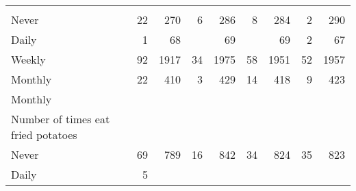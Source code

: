 \documentclass{article}
\begin{document}
\begin{tabular}{lllllllll}
  \multicolumn{1}{r}{} &
  \multicolumn{1}{r}{} &
  \multicolumn{1}{r}{} &
  \multicolumn{1}{r}{} \\
\multicolumn{1}{l}{\hspace{5em}Never} &
  \multicolumn{1}{|r}{22} &
  \multicolumn{1}{r}{270} &
  \multicolumn{1}{r}{6} &
  \multicolumn{1}{r}{286} &
  \multicolumn{1}{r}{8} &
  \multicolumn{1}{r}{284} &
  \multicolumn{1}{r}{2} &
  \multicolumn{1}{r}{290} \\
\multicolumn{1}{l}{\hspace{5em}Daily} &
  \multicolumn{1}{|r}{1} &
  \multicolumn{1}{r}{68} &
  \multicolumn{1}{r}{} &
  \multicolumn{1}{r}{69} &
  \multicolumn{1}{r}{} &
  \multicolumn{1}{r}{69} &
  \multicolumn{1}{r}{2} &
  \multicolumn{1}{r}{67} \\
\multicolumn{1}{l}{\hspace{5em}Weekly} &
  \multicolumn{1}{|r}{92} &
  \multicolumn{1}{r}{1917} &
  \multicolumn{1}{r}{34} &
  \multicolumn{1}{r}{1975} &
  \multicolumn{1}{r}{58} &
  \multicolumn{1}{r}{1951} &
  \multicolumn{1}{r}{52} &
  \multicolumn{1}{r}{1957} \\
\multicolumn{1}{l}{\hspace{5em}Monthly} &
  \multicolumn{1}{|r}{22} &
  \multicolumn{1}{r}{410} &
  \multicolumn{1}{r}{3} &
  \multicolumn{1}{r}{429} &
  \multicolumn{1}{r}{14} &
  \multicolumn{1}{r}{418} &
  \multicolumn{1}{r}{9} &
  \multicolumn{1}{r}{423} \\
\multicolumn{1}{l}{\hspace{3em}Monthly} &
  \multicolumn{1}{|r}{} &
  \multicolumn{1}{r}{} &
  \multicolumn{1}{r}{} &
  \multicolumn{1}{r}{} &
  \multicolumn{1}{r}{} &
  \multicolumn{1}{r}{} &
  \multicolumn{1}{r}{} &
  \multicolumn{1}{r}{} \\
\multicolumn{1}{l}{\hspace{4em}Number of times eat fried potatoes} &
  \multicolumn{1}{|r}{} &
  \multicolumn{1}{r}{} &
  \multicolumn{1}{r}{} &
  \multicolumn{1}{r}{} &
  \multicolumn{1}{r}{} &
  \multicolumn{1}{r}{} &
  \multicolumn{1}{r}{} &
  \multicolumn{1}{r}{} \\
\multicolumn{1}{l}{\hspace{5em}Never} &
  \multicolumn{1}{|r}{69} &
  \multicolumn{1}{r}{789} &
  \multicolumn{1}{r}{16} &
  \multicolumn{1}{r}{842} &
  \multicolumn{1}{r}{34} &
  \multicolumn{1}{r}{824} &
  \multicolumn{1}{r}{35} &
  \multicolumn{1}{r}{823} \\
\multicolumn{1}{l}{\hspace{5em}Daily} &
  \multicolumn{1}{|r}{5} &

\end{tabular}
\end{document}
